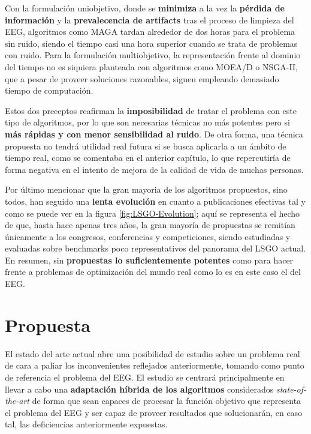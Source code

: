 Con la formulación uniobjetivo, donde se \textbf{minimiza} a la vez la \textbf{pérdida de información} y la \textbf{prevalecencia de artifacts} tras el proceso de limpieza del EEG, algoritmos como MAGA tardan alrededor de dos horas para el problema sin ruido, siendo el tiempo casi una hora superior cuando se trata de problemas con ruido. Para la formulación multiobjetivo, la representación frente al dominio del tiempo no es siquiera planteada con algoritmos como MOEA/D o NSGA-II, que a pesar de proveer soluciones razonables, siguen empleando demasiado tiempo de computación.

Estos dos preceptos reafirman la \textbf{imposibilidad} de tratar el problema con este tipo de algoritmos, por lo que son necesarias técnicas no más potentes pero si \textbf{más rápidas y con menor sensibilidad al ruido}. De otra forma, una técnica propuesta no tendrá utilidad real futura si se busca aplicarla a un ámbito de tiempo real, como se comentaba en el anterior capítulo, lo que repercutiría de forma negativa en el intento de mejora de la calidad de vida de muchas personas.

Por último mencionar que la gran mayoria de los algoritmos propuestos, sino todos, han seguido una \textbf{lenta evolución} en cuanto a publicaciones efectivas tal y como se puede ver en la figura \ref{fig:LSGO-Evolution}; aquí se representa el hecho de que, hasta hace apenas tres años, la gran mayoría de propuestas se remitían únicamente a los congresos, conferencias y competiciones, siendo estudiadas y evaluadas sobre benchmarks poco representativos del panorama del LSGO actual. En resumen, sin \textbf{propuestas lo suficientemente potentes} como para hacer frente a problemas de optimización del mundo real como lo es en este caso el del EEG.

\section{Propuesta}\label{Propuesta}

El estado del arte actual abre una posibilidad de estudio sobre un problema real de cara a paliar los inconvenientes reflejados anteriormente, tomando como punto de referencia el problema del EEG. El estudio se centrará principalmente en llevar a cabo una \textbf{adaptación híbrida de los algoritmos} considerados \textit{state-of-the-art} de forma que sean capaces de procesar la función objetivo que representa el problema del EEG y ser capaz de proveer resultados que solucionarán, en caso tal, las deficiencias anteriormente expuestas.

